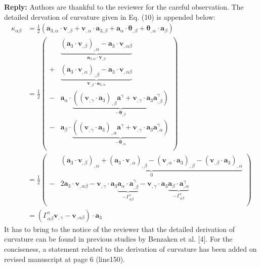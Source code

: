\documentclass{article}
\begin{document}
\textbf{Reply:} Authors are thankful to the reviewer for the careful observation. The detailed dervation of curvature given in Eq. (10) is appended below:
\begin{equation}
    \begin{split}
        \kappa_{\alpha\beta} &=\frac{1}{2}(\boldsymbol a_{3,\alpha} \cdot \boldsymbol v_{,\beta} + \boldsymbol v_{,\alpha} \cdot \boldsymbol a_{3,\beta} + \boldsymbol a_\alpha \cdot \boldsymbol \theta_{,\beta} + \boldsymbol \theta_{,\alpha} \cdot \boldsymbol a_\beta) \\
        &=\frac{1}{2} \left ( 
        \begin{split}
            &\underbrace{(\boldsymbol a_3 \cdot \boldsymbol v_{,\beta})_{,\alpha} - \boldsymbol a_3 \cdot \boldsymbol v_{,\alpha\beta}}_{\boldsymbol a_{3,\alpha} \cdot \boldsymbol v_{,\beta}} \\
            +&\underbrace{(\boldsymbol a_3 \cdot \boldsymbol v_{,\alpha})_{,\beta} - \boldsymbol a_3 \cdot \boldsymbol v_{,\alpha\beta}}_{\boldsymbol v_{,\beta} \cdot \boldsymbol a_{3,\alpha}} \\
            -& \boldsymbol a_\alpha \cdot \underbrace{((\boldsymbol v_{,\gamma} \cdot \boldsymbol a_3)_{,\beta} \boldsymbol a^\gamma + \boldsymbol v_{,\gamma} \cdot \boldsymbol a_3 \boldsymbol a^\gamma_{,\beta})}_{-\boldsymbol \theta_{,\beta}} \\
            -& \boldsymbol a_\beta \cdot \underbrace{((\boldsymbol v_{,\gamma} \cdot \boldsymbol a_3)_{,\alpha} \boldsymbol a^\gamma + \boldsymbol v_{,\gamma} \cdot \boldsymbol a_3 \boldsymbol a^\gamma_{,\alpha})}_{-\boldsymbol \theta_{,\alpha}} \\
        \end{split}
        \right ) \\
        &=\frac{1}{2} \left ( 
        \begin{split}
            &\underbrace{(\boldsymbol a_3 \cdot \boldsymbol v_{,\beta})_{,\alpha}
            +(\boldsymbol a_3 \cdot \boldsymbol v_{,\alpha})_{,\beta}
            -(\boldsymbol v_{,\alpha} \cdot \boldsymbol a_3)_{,\beta}
            -(\boldsymbol v_{,\beta} \cdot \boldsymbol a_3)_{,\alpha}}_{0} \\
            -&2\boldsymbol a_3 \cdot \boldsymbol v_{,\alpha\beta}
            - \boldsymbol v_{,\gamma} \cdot \boldsymbol a_3 \underbrace{\boldsymbol a_\alpha \cdot \boldsymbol a^\gamma_{,\beta}}_{-\Gamma_{\alpha\beta}^\gamma}
            - \boldsymbol v_{,\gamma} \cdot \boldsymbol a_3 \underbrace{\boldsymbol a_\beta \cdot \boldsymbol a^\gamma_{,\alpha}}_{-\Gamma_{\alpha\beta}^\gamma} \\
        \end{split}
        \right ) \\
        &= (\Gamma_{\alpha\beta}^\gamma \boldsymbol v_{,\gamma} - \boldsymbol v_{,\alpha\beta}) \cdot \boldsymbol a_3
    \end{split}
\end{equation}
It has to bring to the notice of the reviewer that the detailed derivation of curvature can be found in previous studies by Benzaken et al. [4]. For the conciseness, a statement related to the derivation of curvature has been added on revised manuscript at page 6 (line150). 
\end{document}
